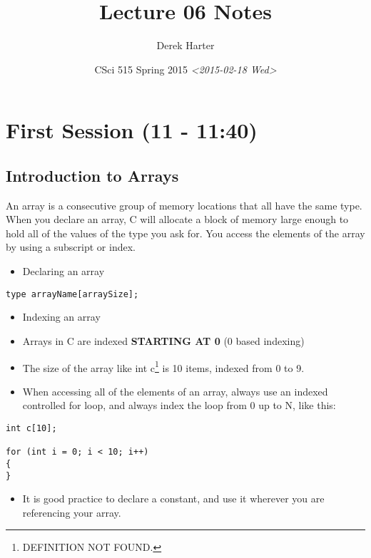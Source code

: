 \documentclass[11pt]{article}
\author{Derek Harter}
\date{CSci 515 Spring 2015 \textit{<2015-02-18 Wed>}}
\title{Lecture 06 Notes}
\begin{document}
\maketitle

\section{First Session (11 - 11:40)}
\label{sec-1}
\subsection{Introduction to Arrays}
\label{sec-1-1}
An array is a consecutive group of memory locations that all have the
same type.  When you declare an array, C will allocate a block of memory
large enough to hold all of the values of the type you ask for.  You access
the elements of the array by using a subscript or index.

\begin{itemize}
\item Declaring an array
\end{itemize}

\begin{verbatim}
type arrayName[arraySize];
\end{verbatim}

\begin{itemize}
\item Indexing an array
\item Arrays in C are indexed \textbf{STARTING AT 0} (0 based indexing)
\item The size of the array like int c\footnote{DEFINITION NOT FOUND.} is 10 items, indexed from 0 to 9.
\item When accessing all of the elements of an array, always use an indexed
controlled for loop, and always index the loop from 0 up to N, like this:
\end{itemize}

\begin{verbatim}
int c[10];

for (int i = 0; i < 10; i++)
{
}
\end{verbatim}

\begin{itemize}
\item It is good practice to declare a constant, and use it wherever you are
referencing your array.
\end{itemize}
\end{document}
